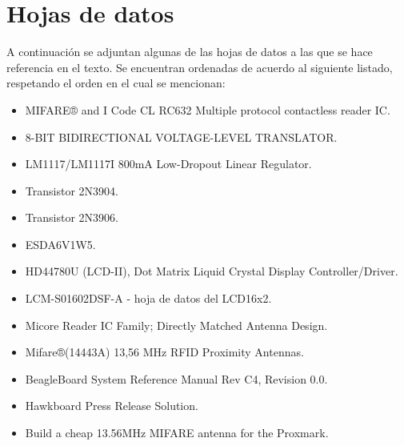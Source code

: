 \chapter{Hojas de datos}\label{HD}

A continuación se adjuntan algunas de las hojas de datos a las que se hace referencia en el texto.
Se encuentran ordenadas de acuerdo al siguiente listado, respetando el orden en el cual se mencionan:

\begin{itemize}
\item MIFARE® and I Code CL RC632 Multiple protocol contactless reader IC.
\item 8-BIT BIDIRECTIONAL VOLTAGE-LEVEL TRANSLATOR.
\item LM1117/LM1117I 800mA Low-Dropout Linear Regulator.
\item Transistor 2N3904.
\item Transistor 2N3906.
\item ESDA6V1W5.
\item HD44780U (LCD-II), Dot Matrix Liquid Crystal Display Controller/Driver.
\item LCM-S01602DSF-A - hoja de datos del LCD16x2.
\item Micore Reader IC Family; Directly Matched Antenna Design.
\item Mifare®(14443A) 13,56 MHz RFID Proximity Antennas.
\item BeagleBoard System Reference Manual Rev C4, Revision 0.0.
\item Hawkboard Press Release Solution.
\item Build a cheap 13.56MHz MIFARE antenna for the Proxmark.
\end{itemize}

%

%

%

%

%

%

%

%

%

%

%

%

%